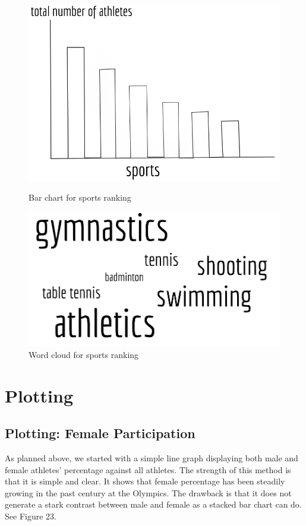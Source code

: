 \documentclass[12pt]{article}
\begin{document}
\begin{figure}[!t]
  \begin{minipage}[b]{0.45\textwidth}
  \centering
    \includegraphics[scale=0.3]{pics/7.png}
    \caption{\small Bar chart for sports ranking}
    \label{fig:1}
  \end{minipage}
  \hfill
  \begin{minipage}[b]{0.45\textwidth}
  \centering
    \includegraphics[scale=0.3]{pics/8.png}
    \caption{\small Word cloud for sports ranking}
    \label{fig:2}
  \end{minipage}
\end{figure}

\section{Plotting}
\subsection{Plotting: Female Participation}
As planned above, we started with a simple line graph displaying both male and female athletes’ percentage against all athletes. The strength of this method is that it is simple and clear. It shows that female percentage has been steadily growing in the past century at the Olympics. The drawback is that it does not generate a stark contrast between male and female as a stacked bar chart can do. See Figure 23. 
\end{document}
